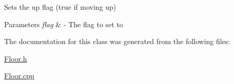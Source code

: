 Sets the up flag (true if moving up) 


\begin{DoxyParams}{Parameters}
{\em flag} & -\/ The flag to set to \\
\hline
\end{DoxyParams}


The documentation for this class was generated from the following files\+:\begin{DoxyCompactItemize}
\item 
\hyperlink{_floor_8h}{Floor.\+h}\item 
\hyperlink{_floor_8cpp}{Floor.\+cpp}\end{DoxyCompactItemize}
